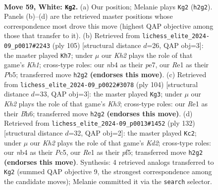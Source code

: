 \documentclass[11pt]{article}
\begin{document}
\clearpage

\begin{figure}[p]\centering
\begin{subfigure}{0.46\textwidth}\centering
\resizebox{\linewidth}{!}{%
\newchessgame
\chessboard[
  setfen={1k6/1p5p/6pP/p4p2/1n3P2/1r6/3R3K/4R3 w - - 5 59},
  showmover=false,
  pgfstyle=straightmove, color=movearrow, markmove={h2-g2}
]}
\caption{}
\end{subfigure}\hfill
\begin{subfigure}{0.46\textwidth}\centering
\resizebox{\linewidth}{!}{%
\newchessgame
\chessboard[
  setfen={1r5k/4P3/5K1p/pp5P/8/2P3R1/1P6/8 b - - 0 53},
  showmover=false,
  pgfstyle=straightmove, color=movearrow, markmove={h8-h7}
]}
\caption{}
\end{subfigure}
\\[4pt]
\begin{subfigure}{0.46\textwidth}\centering
\resizebox{\linewidth}{!}{%
\newchessgame
\chessboard[
  setfen={8/2k5/1p2rp1B/p3n2P/P7/2P4K/8/3R4 w - - 0 53},
  showmover=false,
  pgfstyle=straightmove, color=movearrow, markmove={h3-g3}
]}
\caption{}
\end{subfigure}\hfill
\begin{subfigure}{0.46\textwidth}\centering
\resizebox{\linewidth}{!}{%
\newchessgame
\chessboard[
  setfen={2R5/5p2/p3p3/2P1Ppk1/8/8/3K4/1r6 w - - 3 67},
  showmover=false,
  pgfstyle=straightmove, color=movearrow, markmove={d2-c2}
]}
\caption{}
\end{subfigure}
\caption{\textbf{Move 59, White: \texttt{Kg2}.} (a) Our position; Melanie plays \texttt{Kg2} (\texttt{h2g2}). Panels (b)--(d) are the retrieved master positions whose correspondence most drove this move (highest QAP objective among those that transfer to it). (b) Retrieved from \texttt{lichess\_elite\_2024-09\_p0017\#2243} (ply 105) [structural distance $d$=26, QAP obj=3]: the master played \texttt{Kh7}; under $\mu$ our \emph{Kh2} plays the role of that game's \emph{Kh1}; cross-type roles: our \emph{n}b4 as their \emph{p}e7, our \emph{R}e1 as their \emph{P}b5; transferred move \texttt{h2g2} \textbf{(endorses this move)}. (c) Retrieved from \texttt{lichess\_elite\_2024-09\_p0022\#3078} (ply 104) [structural distance $d$=33, QAP obj=3]: the master played \texttt{Kg3}; under $\mu$ our \emph{Kh2} plays the role of that game's \emph{Kh3}; cross-type roles: our \emph{R}e1 as their \emph{B}h6; transferred move \texttt{h2g2} \textbf{(endorses this move)}. (d) Retrieved from \texttt{lichess\_elite\_2024-09\_p0013\#1452} (ply 132) [structural distance $d$=32, QAP obj=2]: the master played \texttt{Kc2}; under $\mu$ our \emph{Kh2} plays the role of that game's \emph{Kd2}; cross-type roles: our \emph{n}b4 as their \emph{P}c5, our \emph{R}e1 as their \emph{p}f5; transferred move \texttt{h2g2} \textbf{(endorses this move)}. Synthesis: 4 retrieved analogs transferred to \texttt{Kg2} (summed QAP objective 9, the strongest correspondence among the candidate moves); Melanie committed it via the \texttt{search} selector.}
\label{fig:thought-m116}
\end{figure}
\end{document}
